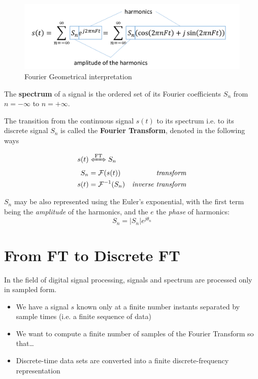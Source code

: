 \begin{figure}[htbp]
   \centering
   \includegraphics{images/fourier_geometric.png}
   \caption{Fourier Geometrical interpretation}
   \label{fig:fourier_geometric}
\end{figure}

\begin{definition}
   The \textbf{spectrum} of a signal is the ordered set of its Fourier coefficients $S_n$ from $n = -\infty$ to $n = +\infty$.
\end{definition}

\begin{definition}
   The transition from the continuous signal $s(t)$ to its spectrum i.e. to its discrete signal $S_n$ is called the \textbf{Fourier Transform}, denoted in the following ways

   \begin{align}
      s(t) & \xLeftrightarrow{\text{FT}} S_n\\
      S_n & = \mathcal{F}(s(t)) & \textit{transform}\\
      s(t) & = \mathcal{F}^{-1}(S_n) & \textit{inverse transform}
   \end{align}
\end{definition}

$S_n$ may be also represented using the Euler's exponential, with the first term being the \textit{amplitude} of the harmonics, and the $e$ the \textit{phase} of harmonics:
\begin{equation}
   S_n=|S_n|e^{j\theta_n}
\end{equation}

\section{From FT to Discrete FT}
In the field of digital signal processing, signals and spectrum are processed only in sampled form.
\begin{itemize}
   \item We have a signal $s$ known only at a finite number instants separated by sample times (i.e. a finite sequence of data)
   \item We want to compute a finite number of samples of the Fourier Transform so that\dots
   \item Discrete-time data sets are converted into a finite discrete-frequency representation
\end{itemize}

